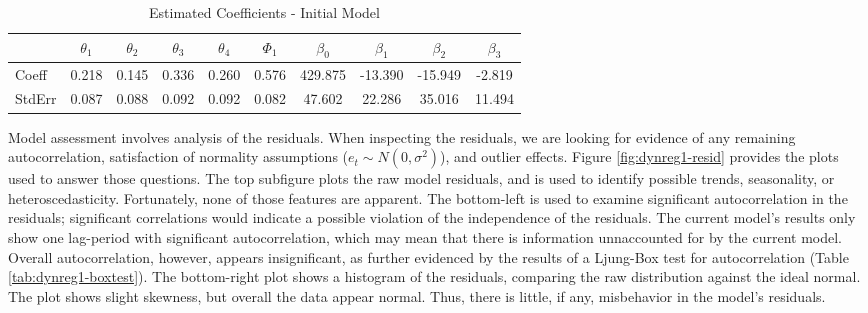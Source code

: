 \documentclass[12pt,letterpaper,toc=flat,oneside]{report}
\theoremstyle{definition}
\theoremstyle{definition}
\theoremstyle{definition}
\theoremstyle{remark}
\begin{document}
\begin{table}[!h]

\caption{\label{tab:dynreg1-coeff}Estimated Coefficients - Initial Model}
\centering
\begin{tabular}[t]{lccccccccc}
\toprule
\bfseries{ } & \bfseries{$\theta_1$} & \bfseries{$\theta_2$} & \bfseries{$\theta_3$} & \bfseries{$\theta_4$} & \bfseries{$\Phi_1$} & \bfseries{$\beta_0$} & \bfseries{$\beta_1$} & \bfseries{$\beta_2$} & \bfseries{$\beta_3$}\\
\midrule
Coeff & 0.218 & 0.145 & 0.336 & 0.260 & 0.576 & 429.875 & -13.390 & -15.949 & -2.819\\
StdErr & 0.087 & 0.088 & 0.092 & 0.092 & 0.082 & 47.602 & 22.286 & 35.016 & 11.494\\
\bottomrule
\end{tabular}
\end{table}

Model assessment involves analysis of the residuals. When inspecting the
residuals, we are looking for evidence of any remaining autocorrelation,
satisfaction of normality assumptions (\(e_t \sim N(0,\sigma^2)\)), and
outlier effects. Figure \ref{fig:dynreg1-resid} provides the plots used
to answer those questions. The top subfigure plots the raw model
residuals, and is used to identify possible trends, seasonality, or
heteroscedasticity. Fortunately, none of those features are apparent.
The bottom-left is used to examine significant autocorrelation in the
residuals; significant correlations would indicate a possible violation
of the independence of the residuals. The current model's results only
show one lag-period with significant autocorrelation, which may mean
that there is information unnaccounted for by the current model. Overall
autocorrelation, however, appears insignificant, as further evidenced by
the results of a Ljung-Box test for autocorrelation (Table
\ref{tab:dynreg1-boxtest}). The bottom-right plot shows a histogram of
the residuals, comparing the raw distribution against the ideal normal.
The plot shows slight skewness, but overall the data appear normal.
Thus, there is little, if any, misbehavior in the model's residuals.
\end{document}
